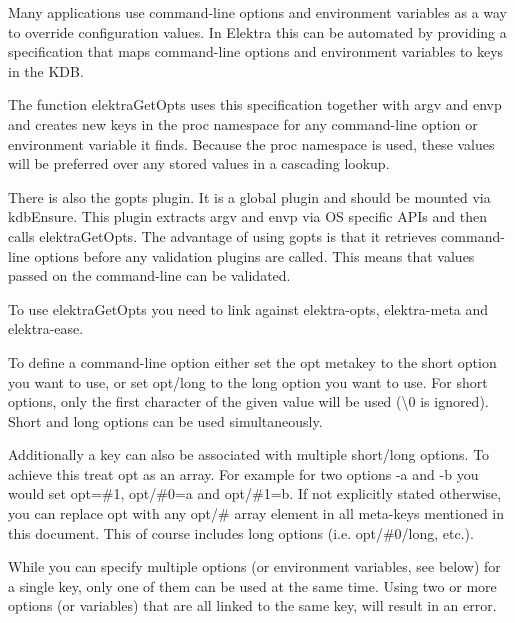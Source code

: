 Many applications use command-\/line options and environment variables as a way to override configuration values. In Elektra this can be automated by providing a specification that maps command-\/line options and environment variables to keys in the K\+DB.

The function {\ttfamily elektra\+Get\+Opts} uses this specification together with {\ttfamily argv} and {\ttfamily envp} and creates new keys in the {\ttfamily proc} namespace for any command-\/line option or environment variable it finds. Because the {\ttfamily proc} namespace is used, these values will be preferred over any stored values in a cascading lookup.

There is also the {\ttfamily gopts} plugin. It is a global plugin and should be mounted via {\ttfamily kdb\+Ensure}. This plugin extracts {\ttfamily argv} and {\ttfamily envp} via OS specific A\+P\+Is and then calls {\ttfamily elektra\+Get\+Opts}. The advantage of using {\ttfamily gopts} is that it retrieves command-\/line options before any validation plugins are called. This means that values passed on the command-\/line can be validated.

To use {\ttfamily elektra\+Get\+Opts} you need to link against {\ttfamily elektra-\/opts}, {\ttfamily elektra-\/meta} and {\ttfamily elektra-\/ease}.

To define a command-\/line option either set the {\ttfamily opt} metakey to the short option you want to use, or set {\ttfamily opt/long} to the long option you want to use. For short options, only the first character of the given value will be used (\textquotesingle{}\textbackslash{}0\textquotesingle{} is ignored). Short and long options can be used simultaneously.

Additionally a key can also be associated with multiple short/long options. To achieve this treat {\ttfamily opt} as an array. For example for two options {\ttfamily -\/a} and {\ttfamily -\/b} you would set {\ttfamily opt=\#1}, {\ttfamily opt/\#0=a} and {\ttfamily opt/\#1=b}. If not explicitly stated otherwise, you can replace {\ttfamily opt} with any {\ttfamily opt/\#} array element in all meta-\/keys mentioned in this document. This of course includes long options (i.\+e. {\ttfamily opt/\#0/long}, etc.).

While you can specify multiple options (or environment variables, see below) for a single key, only one of them can be used at the same time. Using two or more options (or variables) that are all linked to the same key, will result in an error.

